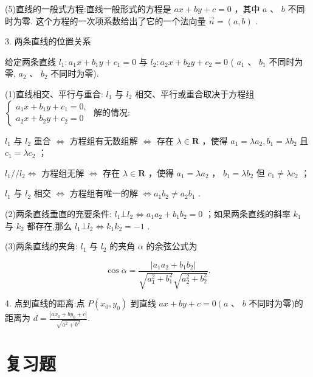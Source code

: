 \documentclass[10pt]{article}
\newcommand*\circled[1]{\tikz[baseline=(char.base)]{\node[shape=circle,draw,inner sep=1.5pt] (char) {\small #1};}}
\begin{document}
(5)直线的一般式方程:直线一般形式的方程是 \({ax} + {by} + c = 0\) ，其中 \(a\) 、 \(b\) 不同时为零. 这个方程的一次项系数给出了它的一个法向量 \(\overrightarrow{n} = \left( {a,b}\right)\) .

3. 两条直线的位置关系

给定两条直线 \({l}_{1} : {a}_{1}x + {b}_{1}y + {c}_{1} = 0\) 与 \({l}_{2} : {a}_{2}x + {b}_{2}y + {c}_{2} = 0\) ( \({a}_{1}\text{ 、 }{b}_{1}\) 不同时为零, \({a}_{2}\text{ 、 }{b}_{2}\) 不同时为零).

(1)直线相交、平行与重合: \({l}_{1}\) 与 \({l}_{2}\) 相交、平行或重合取决于方程组 \(\left\{  \begin{array}{l} {a}_{1}x + {b}_{1}y + {c}_{1} = 0, \\  {a}_{2}x + {b}_{2}y + {c}_{2} = 0 \end{array}\right.\) 解的情况:

 \circled{1}  \({l}_{1}\) 与 \({l}_{2}\) 重合 \(\Leftrightarrow\) 方程组有无数组解 \(\Leftrightarrow\) 存在 \(\lambda  \in  \mathbf{R}\) ，使得 \({a}_{1} = \lambda {a}_{2},{b}_{1} = \lambda {b}_{2}\) 且 \({c}_{1} = \lambda {c}_{2}\) ；

 \circled{2}  \({l}_{1}//{l}_{2} \Leftrightarrow\) 方程组无解 \(\Leftrightarrow\) 存在 \(\lambda  \in  \mathbf{R}\) ，使得 \({a}_{1} = \lambda {a}_{2}\) ， \({b}_{1} = \lambda {b}_{2}\) 但 \({c}_{1} \neq  \lambda {c}_{2}\) ；

 \circled{3}  \({l}_{1}\) 与 \({l}_{2}\) 相交 \(\Leftrightarrow\) 方程组有唯一的解 \(\Leftrightarrow  {a}_{1}{b}_{2} \neq  {a}_{2}{b}_{1}\) .

(2)两条直线垂直的充要条件: \({l}_{1} \bot  {l}_{2} \Leftrightarrow  {a}_{1}{a}_{2} + {b}_{1}{b}_{2} = 0\) ；如果两条直线的斜率 \({k}_{1}\) 与 \({k}_{2}\) 都存在,那么 \({l}_{1} \bot  {l}_{2} \Leftrightarrow  {k}_{1}{k}_{2} =  - 1\) .

(3)两条直线的夹角: \({l}_{1}\) 与 \({l}_{2}\) 的夹角 \(\alpha\) 的余弦公式为

\[
\cos \alpha  = \frac{\left| {a}_{1}{a}_{2} + {b}_{1}{b}_{2}\right| }{\sqrt{{a}_{1}^{2} + {b}_{1}^{2}}\sqrt{{a}_{2}^{2} + {b}_{2}^{2}}}.
\]

4. 点到直线的距离:点 \(P\left( {{x}_{0},{y}_{0}}\right)\) 到直线 \({ax} + {by} + c = 0\left( {a\text{ 、 }b}\right.\) 不同时为零)的距离为 \(d = \frac{\left| a{x}_{0} + b{y}_{0} + c\right| }{\sqrt{{a}^{2} + {b}^{2}}}.\)

\section*{复习题}
\end{document}
